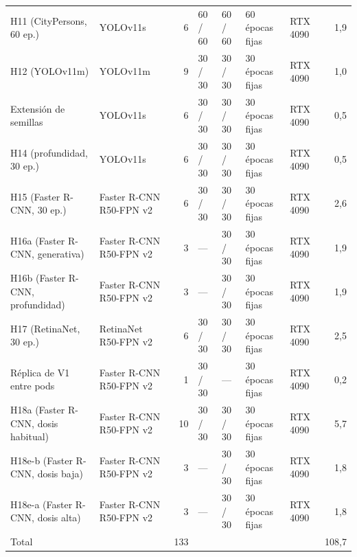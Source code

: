 \begin{table}[H]
{\begin{tabular}{@{}l l r l l l l r@{}}
H11 (CityPersons, 60 ep.) & YOLOv11s & 6 & 60 / 60 & 60 / 60 & 60 épocas fijas & RTX 4090 & 1{,}9 \\
H12 (YOLOv11m) & YOLOv11m & 9 & 30 / 30 & 30 / 30 & 30 épocas fijas & RTX 4090 & 1{,}0 \\
Extensión de semillas & YOLOv11s & 6 & 30 / 30 & 30 / 30 & 30 épocas fijas & RTX 4090 & 0{,}5 \\
H14 (profundidad, 30 ep.) & YOLOv11s & 6 & 30 / 30 & 30 / 30 & 30 épocas fijas & RTX 4090 & 0{,}5 \\
H15 (Faster R-CNN, 30 ep.) & Faster R-CNN R50-FPN v2 & 6 & 30 / 30 & 30 / 30 & 30 épocas fijas & RTX 4090 & 2{,}6 \\
H16a (Faster R-CNN, generativa) & Faster R-CNN R50-FPN v2 & 3 & --- & 30 / 30 & 30 épocas fijas & RTX 4090 & 1{,}9 \\
H16b (Faster R-CNN, profundidad) & Faster R-CNN R50-FPN v2 & 3 & --- & 30 / 30 & 30 épocas fijas & RTX 4090 & 1{,}9 \\
H17 (RetinaNet, 30 ep.) & RetinaNet R50-FPN v2 & 6 & 30 / 30 & 30 / 30 & 30 épocas fijas & RTX 4090 & 2{,}5 \\
Réplica de V1 entre pods & Faster R-CNN R50-FPN v2 & 1 & 30 / 30 & --- & 30 épocas fijas & RTX 4090 & 0{,}2 \\
H18a (Faster R-CNN, dosis habitual) & Faster R-CNN R50-FPN v2 & 10 & 30 / 30 & 30 / 30 & 30 épocas fijas & RTX 4090 & 5{,}7 \\
H18e-b (Faster R-CNN, dosis baja) & Faster R-CNN R50-FPN v2 & 3 & --- & 30 / 30 & 30 épocas fijas & RTX 4090 & 1{,}8 \\
H18e-a (Faster R-CNN, dosis alta) & Faster R-CNN R50-FPN v2 & 3 & --- & 30 / 30 & 30 épocas fijas & RTX 4090 & 1{,}8 \\
\midrule Total & & 133 & & & & & 108{,}7 \\
\bottomrule\end{tabular}}\end{table}
